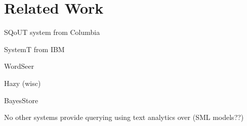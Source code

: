 
\section{Related Work}

SQoUT system from Columbia \cite{Jain:2009:BQO:1519103.1519108}

SystemT from IBM \cite{Li:2011:SDI:2002440.2002459}

WordSeer \cite{muralidharanvisual}	

Hazy (wisc) \cite{Koc:2011:IMC:1952376.1952380}

BayesStore \cite{Wang:2008:BML:1453856.1453896}


No other systems provide querying using text analytics over (SML models??)
